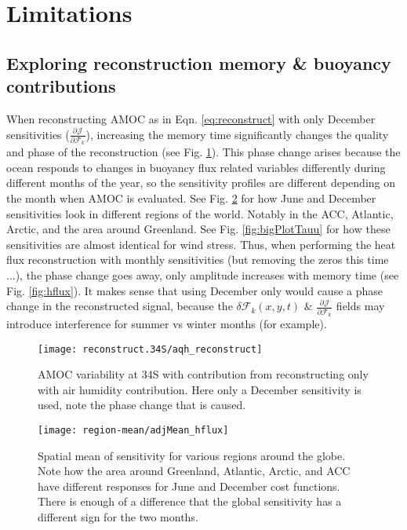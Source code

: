 \documentclass[a4paper,11pt]{article}
\newcommand{\pderiv}[3][]{%
  \ensuremath{\frac{\partial^{#1} {#2}}{\partial {#3}^{#1}}}}
\begin{document}
 \section{Limitations}
 \label{limitations}
  \subsection{Exploring reconstruction memory \& buoyancy contributions}

  When reconstructing AMOC as in Eqn. \ref{eq:reconstruct} with only December sensitivities ($\pderiv{\mathcal{J}}{\mathcal{F}_k}$), increasing the memory time significantly changes the quality and phase of the reconstruction (see Fig. \ref{fig:phaseChangeAqh}). This phase change arises because the ocean responds to changes in buoyancy flux related variables differently during different months of the year, so the sensitivity profiles are different depending on the month when AMOC is evaluated. See Fig. \ref{fig:bigPlotHflux} for how June and December sensitivities look in different regions of the world. Notably in the ACC, Atlantic, Arctic, and the area around Greenland. See Fig. \ref{fig:bigPlotTauu} for how these sensitivities are almost identical for wind stress. Thus, when performing the heat flux reconstruction with monthly sensitivities (but removing the zeros this time ...), the phase change goes away, only amplitude increases with memory time (see Fig. \ref{fig:hflux}). It makes sense that using December only would cause a phase change in the reconstructed signal, because the $\delta\mathcal{F}_k(x,y,t)$ \& $\pderiv{\mathcal{J}}{\mathcal{F}_k}$ fields may introduce interference for summer vs winter months (for example).

  
   \begin{figure}
    \centering
    \texttt{[image: reconstruct.34S/aqh\_reconstruct]}
    \caption{AMOC variability at 34S with contribution from reconstructing only with air humidity contribution. Here only a December sensitivity is used, note the phase change that is caused.} 
    \label{fig:phaseChangeAqh}
   \end{figure}

   \begin{figure}
    \centering
    \texttt{[image: region-mean/adjMean\_hflux]}
    \caption{Spatial mean of sensitivity for various regions around the globe. Note how the area around Greenland, Atlantic, Arctic, and ACC have different responses for June and December cost functions. There is enough of a difference that the global sensitivity has a different sign for the two months.}
    \label{fig:bigPlotHflux}
   \end{figure}
\end{document}
